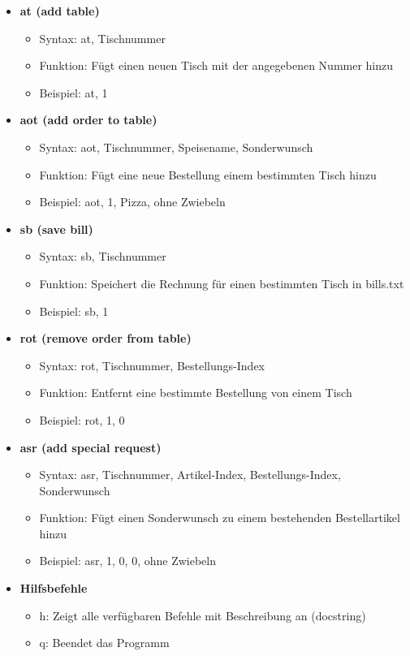 \documentclass[a4paper,11pt]{article}
\begin{document}
\begin{itemize}
    \item \textbf{at (add table)}
    \begin{itemize}
        \item Syntax: at, Tischnummer
        \item Funktion: Fügt einen neuen Tisch mit der angegebenen Nummer hinzu
        \item Beispiel: at, 1
    \end{itemize}

    \item \textbf{aot (add order to table)}
    \begin{itemize}
        \item Syntax: aot, Tischnummer, Speisename, Sonderwunsch
        \item Funktion: Fügt eine neue Bestellung einem bestimmten Tisch hinzu
        \item Beispiel: aot, 1, Pizza, ohne Zwiebeln
    \end{itemize}

    \item \textbf{sb (save bill)}
    \begin{itemize}
        \item Syntax: sb, Tischnummer
        \item Funktion: Speichert die Rechnung für einen bestimmten Tisch in bills.txt
        \item Beispiel: sb, 1
    \end{itemize}

    \item \textbf{rot (remove order from table)}
    \begin{itemize}
        \item Syntax: rot, Tischnummer, Bestellungs-Index
        \item Funktion: Entfernt eine bestimmte Bestellung von einem Tisch
        \item Beispiel: rot, 1, 0
    \end{itemize}

    \item \textbf{asr (add special request)}
    \begin{itemize}
        \item Syntax: asr, Tischnummer, Artikel-Index, Bestellungs-Index, Sonderwunsch
        \item Funktion: Fügt einen Sonderwunsch zu einem bestehenden Bestellartikel hinzu
        \item Beispiel: asr, 1, 0, 0, ohne Zwiebeln
    \end{itemize}

    \item \textbf{Hilfsbefehle}
    \begin{itemize}
        \item h: Zeigt alle verfügbaren Befehle mit Beschreibung an (docstring)
        \item q: Beendet das Programm
    \end{itemize}
\end{itemize}
\end{document}
